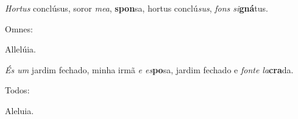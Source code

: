 \begin{greenumerate}
  \setcounter{enumi}{1}


  \item \textit{Hortus} conclúsus, soror \textit{mea}, \textbf{spon}sa, {\GreStar} hortus conclú\textit{sus}, \textit{fons si}\textbf{gná}tus. \begin{rubrica}Omnes:\end{rubrica} Allelúia.

  \switchcolumn\setcounter{enumi}{1}

  \item \textit{És um} jardim fechado, minha irmã \textit{e es}\textbf{po}sa, {\GreStar} jardim fechado e \textit{fonte la}\textbf{cra}da. \begin{rubrica}Todos:\end{rubrica} Aleluia.
\end{greenumerate}
